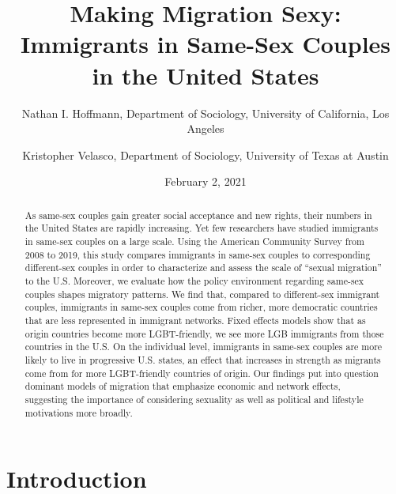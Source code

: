 \documentclass[
  11pt,
]{article}
\title{Making Migration Sexy: Immigrants in Same-Sex Couples in the United States}
\author{Nathan I. Hoffmann, Department of Sociology, University of California, Los Angeles \and Kristopher Velasco, Department of Sociology, University of Texas at Austin}
\date{February 2, 2021}
\begin{document}
\maketitle
\begin{abstract}
As same-sex couples gain greater social acceptance and new rights, their numbers in the United States are rapidly increasing. Yet few researchers have studied immigrants in same-sex couples on a large scale. Using the American Community Survey from 2008 to 2019, this study compares immigrants in same-sex couples to corresponding different-sex couples in order to characterize and assess the scale of ``sexual migration'' to the U.S. Moreover, we evaluate how the policy environment regarding same-sex couples shapes migratory patterns. We find that, compared to different-sex immigrant couples, immigrants in same-sex couples come from richer, more democratic countries that are less represented in immigrant networks. Fixed effects models show that as origin countries become more LGBT-friendly, we see more LGB immigrants from those countries in the U.S. On the individual level, immigrants in same-sex couples are more likely to live in progressive U.S. states, an effect that increases in strength as migrants come from for more LGBT-friendly countries of origin. Our findings put into question dominant models of migration that emphasize economic and network effects, suggesting the importance of considering sexuality as well as political and lifestyle motivations more broadly.
\end{abstract}

\hypertarget{introduction}{%
\section{Introduction}\label{introduction}}
\end{document}
